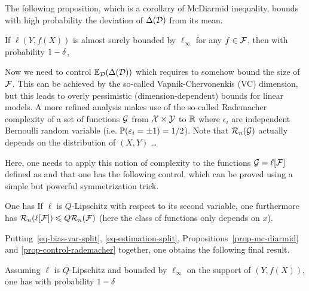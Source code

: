 The following proposition, which is a corollary of McDiarmid inequality, bounds with high probability the deviation of $\Delta(\mathcal{D})$ from its mean.

\begin{prop}\label{prop-mc-diarmid}
	If $\ell(Y,f(X))$ is almost surely bounded by $\ell_\infty$ for any $f \in \mathcal{F}$, then with probability $1-\delta$, 
\end{prop}

Now we need to control $\mathbb{E}_{\mathcal{D}}( \Delta(\mathcal{D}) )$ which requires to somehow bound the size of $\mathcal{F}$. This can be achieved by the so-called Vapnik-Chervonenkis (VC) dimension, but this leads to overly pessimistic (dimension-dependent) bounds for linear models.  A more refined analysis makes use of the so-called Rademacher complexity of a set of functions $\mathcal{G}$ from $\mathcal{X} \times \mathcal{Y}$ to $\mathbb{R}$
where $\epsilon_i$ are independent Bernoulli random variable (i.e. $\mathbb{P}(\varepsilon_i = \pm 1) = 1/2$). Note that $\mathcal{R}_n(\mathcal{G})$ actually depends on the distribution of $(X,Y)$ \ldots

Here, one needs to apply this notion of complexity to the functions $\mathcal{G} = \ell[\mathcal{F}]$ defined as
and that one has the following control, which can be proved using a simple but powerful symmetrization trick. 

\begin{prop}\label{prop-control-rademacher}
	One has
	If $\ell$ is $Q$-Lipschitz with respect to its second variable, one furthermore has $\mathcal{R}_n(\ell[\mathcal{F}]) \leqslant Q \mathcal{R}_n(\mathcal{F})$ (here the class of functions only depends on $x$).
\end{prop}

Putting~\eqref{eq-bias-var-split}, \eqref{eq-estimation-split}, Propositions~\ref{prop-mc-diarmid} and \ref{prop-control-rademacher} together, one obtains the following final result. 

\begin{thm}
	Assuming $\ell$ is $Q$-Lipschitz and bounded by $\ell_\infty$ on the support of $(Y,f(X))$, one has with probability $1-\delta$
\end{thm}

